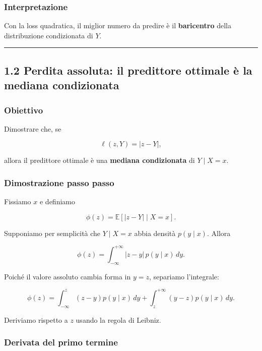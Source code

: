 \documentclass{article}
\begin{document}
\subsubsection{Interpretazione}\label{interpretazione}

Con la loss quadratica, il miglior numero da predire è il
\textbf{baricentro} della distribuzione condizionata di \(Y\).

\begin{center}\rule{0.5\linewidth}{0.5pt}\end{center}

\subsection{1.2 Perdita assoluta: il predittore ottimale è la mediana
condizionata}\label{perdita-assoluta-il-predittore-ottimale-uxe8-la-mediana-condizionata}

\subsubsection{Obiettivo}\label{obiettivo-1}

Dimostrare che, se

\[
\ell(z,Y)=|z-Y|,
\]

allora il predittore ottimale è una \textbf{mediana condizionata} di
\(Y\mid X=x\).

\subsubsection{Dimostrazione passo
passo}\label{dimostrazione-passo-passo-1}

Fissiamo \(x\) e definiamo

\[
\phi(z)=\mathbb{E}[|z-Y|\mid X=x].
\]

Supponiamo per semplicità che \(Y\mid X=x\) abbia densità
\(p(y\mid x)\). Allora

\[
\phi(z)=\int_{-\infty}^{+\infty}|z-y|\,p(y\mid x)\,dy.
\]

Poiché il valore assoluto cambia forma in \(y=z\), separiamo
l'integrale:

\[
\phi(z)=\int_{-\infty}^{z}(z-y)p(y\mid x)\,dy
+\int_{z}^{+\infty}(y-z)p(y\mid x)\,dy.
\]

Deriviamo rispetto a \(z\) usando la regola di Leibniz.

\subsubsection{Derivata del primo
termine}\label{derivata-del-primo-termine}
\end{document}
